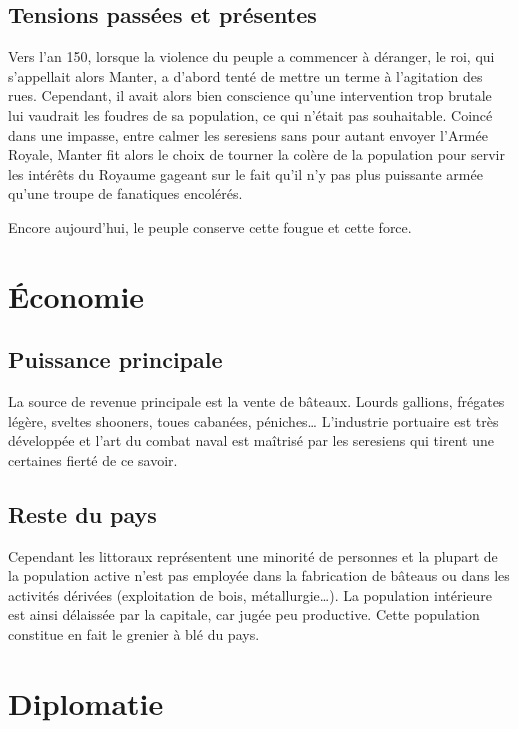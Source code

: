 \documentclass[french, a4paper, 12pt]{article}
\begin{document}
\subsection{Tensions passées et présentes}

Vers l'an 150, lorsque la violence du peuple a commencer à déranger, le roi, qui s'appellait alors Manter, a d'abord tenté de mettre un terme à l'agitation des rues. Cependant, il avait alors bien conscience qu'une intervention trop brutale lui vaudrait les foudres de sa population, ce qui n'était pas souhaitable. Coincé dans une impasse, entre calmer les seresiens sans pour autant envoyer l'Armée Royale, Manter fit alors le choix de tourner la colère de la population pour servir les intérêts du Royaume gageant sur le fait qu'il n'y pas plus puissante armée qu'une troupe de fanatiques encolérés.

Encore aujourd'hui, le peuple conserve cette fougue et cette force.

\section{Économie}

\subsection{Puissance principale}

La source de revenue principale est la vente de bâteaux. Lourds gallions, frégates légère, sveltes shooners, toues cabanées, péniches… L'industrie portuaire est très développée et l'art du combat naval est maîtrisé par les seresiens qui tirent une certaines fierté de ce savoir.

\subsection{Reste du pays}

Cependant les littoraux représentent une minorité de personnes et la plupart de la population active n'est pas employée dans la fabrication de bâteaus ou dans les activités dérivées (exploitation de bois, métallurgie…). La population intérieure est ainsi délaissée par la capitale, car jugée peu productive. Cette population constitue en fait le grenier à blé du pays.

\section{Diplomatie}
\end{document}
